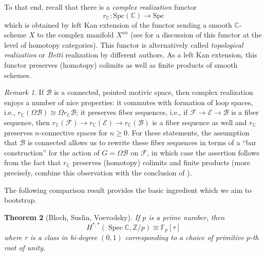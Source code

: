 \documentclass[11pt,leqno]{article}
\newcommand{\Spec}{\operatorname{Spec}}
\newcommand{\cplx}{{\mathbb C}}
\newcommand{\Z}{{\mathbb Z}}
\renewcommand{\1}{{\rm 1\hspace*{-0.4ex}%
\rule{0.1ex}{1.52ex}\hspace*{0.2ex}}}
\newcommand{\Spc}{\mathrm{Spc}}
\newcommand{\<}[1]{{\langle}#1 {\rangle}}
\theoremstyle{plain}
\newtheorem{theorem}{Theorem}[subsection]
\theoremstyle{definition}
\theoremstyle{remark}
\newtheorem{rem}[theorem]{Remark}
\numberwithin{equation}{subsection}
\begin{document}
To that end, recall that there is a {\em complex realization} functor 
\[
r_{\cplx}: \Spc(\cplx) \longrightarrow \Spc
\]
which is obtained by left Kan extension of the functor sending a smooth $\cplx$-scheme $X$ to the complex manifold $X^{an}$ (see \cite[\S 3.3]{MV} for a discussion of this functor at the level of homotopy categories).  This functor is alternatively called {\em topological realization} or {\em Betti} realization by different authors.  As a left Kan extension, this functor preserves (homotopy) colimits as well as finite products of smooth schemes.

\begin{rem}
If $\mathscr{B}$ is a connected, pointed motivic space, then complex realization enjoys a number of nice properties: it commutes with formation of loop spaces, i.e., $r_{\cplx}(\Omega \mathscr{B}) \cong \Omega r_{\cplx} \mathscr{B}$; it preserves fiber sequences, i.e., if $\mathscr{F} \to \mathscr{E} \to \mathscr{B}$ is a fiber sequence, then $r_{\cplx}(\mathscr{F}) \to r_{\cplx}(\mathscr{E}) \to r_{\cplx}(\mathscr{B})$ is a fiber sequence as well and $r_{\cplx}$ preserves $n$-connective spaces for $n \geq 0$.  For these statements, the assumption that $\mathscr{B}$ is connected allows us to rewrite these fiber sequences in terms of a ``bar construction'' for the action of $G = \Omega \mathscr{B}$ on $\mathscr{F}$, in which case the assertion follows from the fact that $r_{\cplx}$ preserves (homotopy) colimits and finite products (more precisely, combine this observation with the conclusion of \cite[Lemma 2.1.16]{ABHFreudenthal}). 
\end{rem}	

The following comparison result provides the basic ingredient which we aim to bootstrap. 

\begin{theorem}[Bloch, Suslin, Voevodsky]
	\label{thm:BlochKatoconj}
	If $p$ is a prime number, then 
	\[
	H^{*,*}(\Spec \cplx,\Z/p) \cong {\mathbb F}_p[\tau] 
	\]
	where $\tau$ is a class in bi-degree $(0,1)$ corresponding to a choice of primitive $p$-th root of unity.
\end{theorem}
\end{document}
